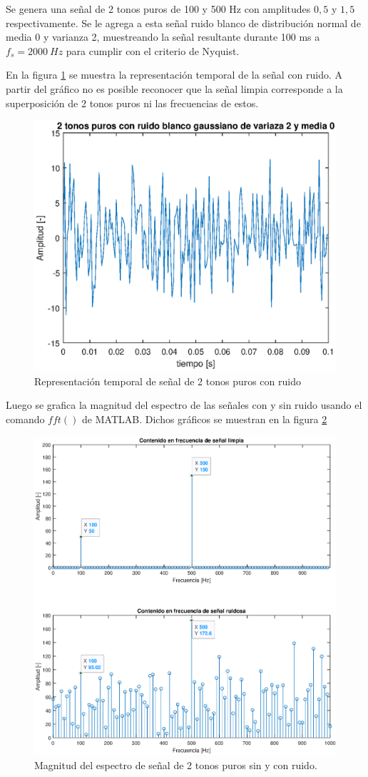 Se genera una señal de 2 tonos puros de 100 y 500 Hz con amplitudes $0,5$ y $1,5$ respectivamente. Se le agrega a esta señal ruido blanco de distribución normal de media 0 y varianza 2, muestreando la señal resultante durante 100 ms a $f_s = 2000~Hz$ para cumplir con el criterio de Nyquist.

En la figura \ref{fig:p2_1t} se muestra la representación temporal de la señal con ruido. A partir del gráfico no es posible reconocer que la señal limpia corresponde a la superposición de 2 tonos puros ni las frecuencias de estos.

\begin{figure}[H]
    \centering
    \includegraphics[width = .8\linewidth]{Figuras/1.eps}
    \caption{Representación temporal de señal de 2 tonos puros con ruido}
    \label{fig:p2_1t}
\end{figure}

Luego se grafica la magnitud del espectro de las señales con y sin ruido usando el comando $fft()$ de MATLAB. Dichos gráficos se muestran en la figura \ref{fig:p2_2mag} 

\begin{figure}[H]
    \centering
    \includegraphics[width = .8\linewidth]{Figuras/2.eps}
    \caption{Magnitud del espectro de señal de 2 tonos puros sin y con ruido.}
    \label{fig:p2_2mag}
\end{figure}

